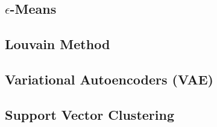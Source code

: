 \subsection{\texorpdfstring{$\epsilon$}{epsilon}-Means}
\label{additional:unsupervised:epsilonMean}

\subsection{Louvain Method}
\label{additional:unsupervised:louvain}

\subsection{Variational Autoencoders (VAE)}
\label{additional:unsupervised:VAE}

\subsection{Support Vector Clustering}
\label{additional:unsupervised:SVC}

